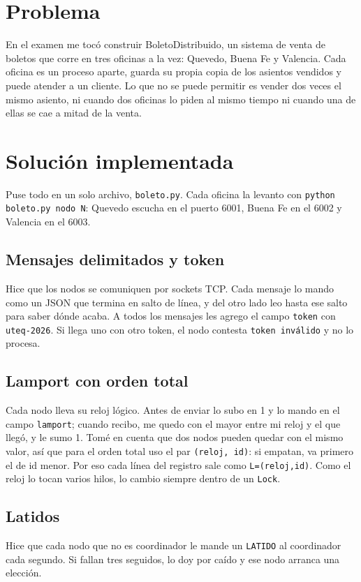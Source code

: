 \documentclass[11pt,a4paper]{article}
\begin{document}
\section{Problema}
En el examen me tocó construir BoletoDistribuido, un sistema de venta de
boletos que corre en tres oficinas a la vez: Quevedo, Buena Fe y Valencia.
Cada oficina es un proceso aparte, guarda su propia copia de los asientos
vendidos y puede atender a un cliente. Lo que no se puede permitir es vender
dos veces el mismo asiento, ni cuando dos oficinas lo piden al mismo tiempo
ni cuando una de ellas se cae a mitad de la venta.

\section{Solución implementada}
Puse todo en un solo archivo, \texttt{boleto.py}. Cada oficina la levanto
con \texttt{python boleto.py nodo N}: Quevedo escucha en el puerto 6001,
Buena Fe en el 6002 y Valencia en el 6003.

\subsection{Mensajes delimitados y token}
Hice que los nodos se comuniquen por sockets TCP. Cada mensaje lo mando
como un JSON que termina en salto de línea, y del otro lado leo hasta ese
salto para saber dónde acaba. A todos los mensajes les agrego el campo \texttt{token} con
\texttt{uteq-2026}. Si llega uno con otro token, el nodo contesta
\texttt{token inválido} y no lo procesa.

\subsection{Lamport con orden total}
Cada nodo lleva su reloj lógico. Antes de enviar lo subo en 1 y lo mando en
el campo \texttt{lamport}; cuando recibo, me quedo con el mayor entre mi
reloj y el que llegó, y le sumo 1. Tomé en cuenta que dos nodos pueden
quedar con el mismo valor, así que para el orden total uso el par
\texttt{(reloj, id)}: si empatan, va primero el de id menor. Por eso cada
línea del registro sale como \texttt{L=(reloj,id)}. Como el reloj lo tocan
varios hilos, lo cambio siempre dentro de un \texttt{Lock}.

\subsection{Latidos}
Hice que cada nodo que no es coordinador le mande un \texttt{LATIDO} al
coordinador cada segundo. Si fallan tres seguidos, lo doy por caído y ese
nodo arranca una elección.
\end{document}

